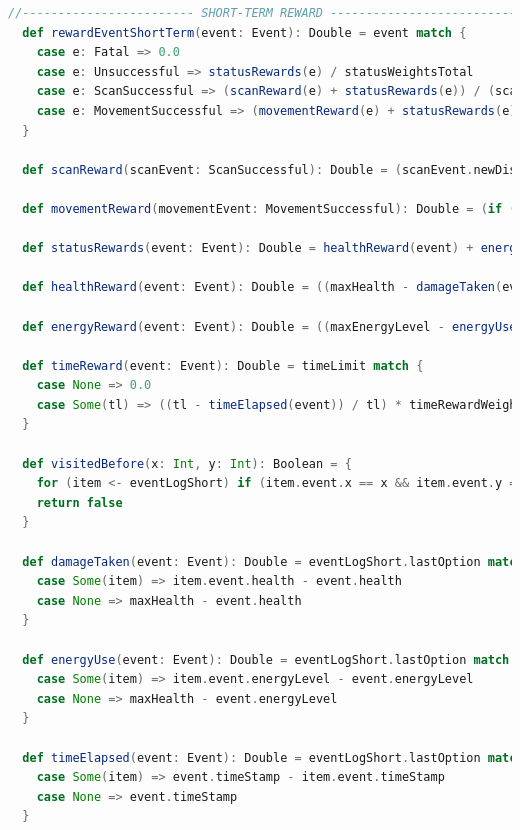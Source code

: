 \begin{lstlisting}[language=Scala, label=code:short_term_reward]
  //------------------------ SHORT-TERM REWARD --------------------------------
  def rewardEventShortTerm(event: Event): Double = event match {
    case e: Fatal => 0.0
    case e: Unsuccessful => statusRewards(e) / statusWeightsTotal
    case e: ScanSuccessful => (scanReward(e) + statusRewards(e)) / (scanRewardWeight + statusWeightsTotal)
    case e: MovementSuccessful => (movementReward(e) + statusRewards(e)) / (movementRewardWeight + statusWeightsTotal)
  }

  def scanReward(scanEvent: ScanSuccessful): Double = (scanEvent.newDiscoveries.toDouble / scanEvent.cellsScanned.toDouble) * scanRewardWeight

  def movementReward(movementEvent: MovementSuccessful): Double = (if (visitedBefore(movementEvent.x, movementEvent.y)) 0.0 else 1.0) * movementRewardWeight

  def statusRewards(event: Event): Double = healthReward(event) + energyReward(event) + timeReward(event)

  def healthReward(event: Event): Double = ((maxHealth - damageTaken(event)) / maxHealth) * healthRewardWeight

  def energyReward(event: Event): Double = ((maxEnergyLevel - energyUse(event)) / maxEnergyLevel) * energyRewardWeight

  def timeReward(event: Event): Double = timeLimit match {
    case None => 0.0
    case Some(tl) => ((tl - timeElapsed(event)) / tl) * timeRewardWeight
  }

  def visitedBefore(x: Int, y: Int): Boolean = {
    for (item <- eventLogShort) if (item.event.x == x && item.event.y == y) return true
    return false
  }

  def damageTaken(event: Event): Double = eventLogShort.lastOption match {
    case Some(item) => item.event.health - event.health
    case None => maxHealth - event.health
  }

  def energyUse(event: Event): Double = eventLogShort.lastOption match {
    case Some(item) => item.event.energyLevel - event.energyLevel
    case None => maxHealth - event.energyLevel
  }

  def timeElapsed(event: Event): Double = eventLogShort.lastOption match {
    case Some(item) => event.timeStamp - item.event.timeStamp
    case None => event.timeStamp
  }
\end{lstlisting}

